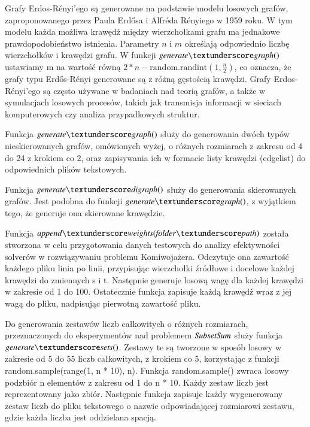 Grafy Erdos-Rényi'ego są generowane na podstawie modelu losowych grafów, zaproponowanego przez Paula Erdősa i Alfréda Rényiego w 1959 roku.
W tym modelu każda możliwa krawędź między wierzchołkami grafu ma jednakowe prawdopodobieństwo istnienia.
Parametry $n$ i $m$ określają odpowiednio liczbę wierzchołków i krawędzi grafu. W funkcji $\generategraph$ ustawiamy m na wartość równą $2 * n - \text{random.randint}(1, \frac{n}{2})$, co oznacza, że grafy typu Erdős-Rényi generowane są z różną gęstością krawędzi.
Grafy Erdos-Rényi'ego są często używane w badaniach nad teorią grafów, a także w symulacjach losowych procesów, takich jak transmisja informacji w sieciach komputerowych czy analiza przypadkowych struktur.

Funkcja $\generategraph$ służy do generowania dwóch typów nieskierowanych grafów, omówionych wyżej, o różnych rozmiarach z zakresu od 4 do 24 z krokiem co 2, oraz zapisywania ich w formacie listy krawędzi (edgelist) do odpowiednich plików tekstowych. 



Funkcja $\generatedigraph$ służy do generowania skierowanych grafów. Jest podobna do funkcji $\generategraph$, z wyjątkiem tego, że generuje ona skierowane krawędzie. 



Funkcja $\appendweights$ została stworzona w celu przygotowania danych testowych do analizy efektywności solverów w rozwiązywaniu problemu Komiwojażera. Odczytuje ona zawartość każdego pliku linia po linii, przypisując wierzchołki źródłowe i docelowe każdej krawędzi do zmiennych s i t. Następnie generuje losową wagę dla każdej krawędzi w zakresie od 1 do 100. Ostatecznie funkcja zapisuje każdą krawędź wraz z jej wagą do pliku, nadpisując pierwotną zawartość pliku.



Do generowania zestawów liczb całkowitych o różnych rozmiarach, przeznaczonych do eksperymentów nad problemem ${\mathit{SubsetSum}}$ służy funkcja $\generatesets$. Zestawy te są tworzone w sposób losowy w zakresie od 5 do 55 liczb całkowitych, z krokiem co 5, korzystając z funkcji random.sample(range(1, n * 10), n). Funkcja random.sample() zwraca losowy podzbiór n elementów z zakresu od 1 do n * 10. Każdy zestaw liczb jest reprezentowany jako zbiór. Następnie funkcja zapisuje każdy wygenerowany zestaw liczb do pliku tekstowego o nazwie odpowiadającej rozmiarowi zestawu, gdzie każda liczba jest oddzielana spacją.

